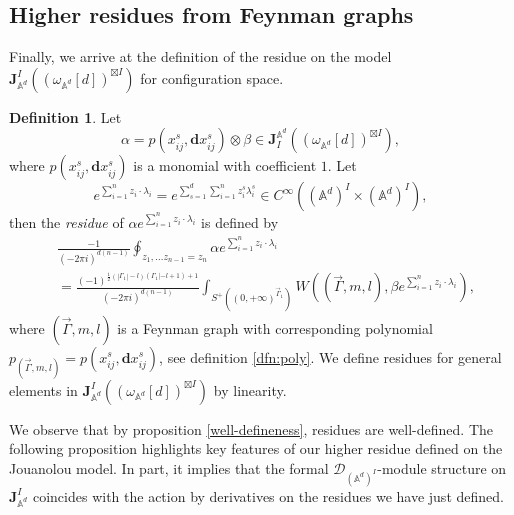 \documentclass[11pt]{amsart}
\theoremstyle{definition}
\newtheorem{defn}[thm]{Definition}
\theoremstyle{remark}
\numberwithin{equation}{section}
\begin{document}
\subsection{Higher residues from Feynman graphs}

Finally, we arrive at the definition of the residue on the model $\mathbf{J}^{ I}_{\mathbb{A}^{d}}((\omega_{\mathbb{A}
^{d}}[d])^{\boxtimes I})$ for configuration space.

\begin{defn}
    Let
    $$
    \alpha=p(x_{ij}^{s},\mathbf{d}x_{ij}^{s})\otimes\beta\in \mathbf{J}_{ I}^{\mathbb{A}^{d}}((\omega_{\mathbb{A}^{d}}[d])^{\boxtimes I}),
    $$
    where $p(x_{ij}^{s},\mathbf{d}x_{ij}^{s})$ is a monomial with coefficient $1$. 
    Let
    $$
    e^{\sum_{i=1}^{n}z_{i}\cdot\lambda_{i}}=e^{\sum_{s=1}^{d}\sum_{i=1}^{n}z^{s}_{i}\lambda^{s}_{i}}\in C^{\infty}((\mathbb{A}^{d})^{ I}\times (\mathbb{A}^{d})^{ I}),
    $$
    then the \textit{residue} of $\alpha e^{\sum_{i=1}^{n}z_{i}\cdot\lambda_{i}}$ is defined by
    \begin{align*}
        &\frac{-1}{(-2\pi i)^{d(n-1)}}\oint_{z_{1},\dots z_{n-1}=z_{n}}\alpha e^{\sum_{i=1}^{n}z_{i}\cdot\lambda_{i}}\\
        &=\frac{(-1)^{\frac{1}{2}(|\Gamma_{1}|-l)(\Gamma_{1}|-l+1)+1}}{(-2\pi i)^{d(n-1)}}\int_{S^{+}((0,+\infty)^{\vec{\Gamma}_{1}})}W((\vec{\Gamma},m,l),\beta e^{\sum_{i=1}^{n}z_{i}\cdot\lambda_{i}}),
    \end{align*}
    where $(\vec{\Gamma},m,l)$ is a Feynman graph with corresponding polynomial $p_{(\vec{\Gamma},m,l)}=p(x_{ij}^{s},
    \mathbf{d}x_{ij}^{s})$, see definition \ref{dfn:poly}. 
    We define residues for general elements in $\mathbf{J}^{ I}_{\mathbb{A}^{d}}((\omega_{\mathbb{A}^{d}}[d])^{\boxtimes
    I})$ by linearity. 
\end{defn}

We observe that by proposition \ref{well-defineness}, residues are well-defined.
The following proposition highlights key features of our higher residue defined on the Jouanolou model. 
In part, it implies that the formal $\mathcal{D}_{(\mathbb{A}^{d})^{ I}}$-module structure on $\mathbf{J}^{ I}_{\mathbb{A}^{d}}$ coincides with the action by derivatives on the residues we have just defined.
\end{document}
